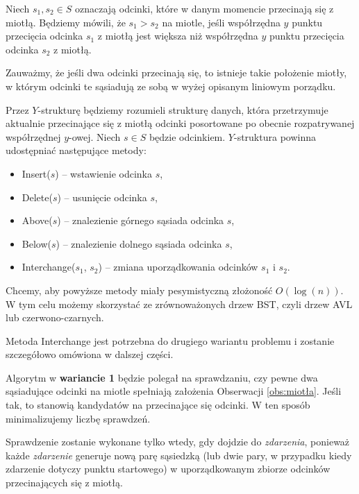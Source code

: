 Niech $s_1, s_2 \in S$ oznaczają odcinki, które w danym momencie przecinają się 
z miotłą. Będziemy mówili, że $s_1 > s_2$ na miotle,
jeśli współrzędna $y$ punktu przecięcia odcinka $s_1$ z miotłą jest większa 
niż współrzędna $y$ punktu przecięcia odcinka $s_2$ z miotłą.

\begin{obs}
	\label{obs:miotła}
	Zauważmy, że jeśli dwa odcinki przecinają się, to istnieje takie położenie
	miotły, w którym odcinki te sąsiadują ze sobą w wyżej opisanym liniowym porządku.
\end{obs} 

Przez $Y$-strukturę będziemy rozumieli strukturę danych, która przetrzymuje aktualnie przecinające się 
z miotłą odcinki posortowane po obecnie rozpatrywanej współrzędnej $y$-owej. Niech $s \in S$ będzie odcinkiem. $Y$-struktura 
powinna udostępniać następujące metody:
\begin{itemize}
	\item Insert($s$) -- wstawienie odcinka $s$,
	\item Delete($s$) -- usunięcie odcinka $s$,
	\item Above($s$) -- znalezienie górnego sąsiada odcinka $s$,
	\item Below($s$) -- znalezienie dolnego sąsiada odcinka $s$,
	\item Interchange($s_1$, $s_2$) -- zmiana uporządkowania odcinków $s_1$ i $s_2$.
\end{itemize}
Chcemy, aby powyższe metody miały pesymistyczną złożoność $O(\log(n))$. W tym celu możemy skorzystać ze zrównoważonych drzew BST, czyli
drzew AVL lub czerwono-czarnych.

Metoda Interchange jest potrzebna do drugiego wariantu 
problemu i zostanie szczegółowo omówiona w dalszej części.

Algorytm w \textbf{wariancie 1} będzie polegał na sprawdzaniu, 
czy pewne dwa sąsiadujące odcinki na miotle spełniają założenia 
Obserwacji \ref{obs:miotła}. Jeśli tak, to stanowią kandydatów na przecinające 
się odcinki. W ten sposób minimalizujemy liczbę sprawdzeń.

Sprawdzenie zostanie wykonane tylko wtedy, gdy dojdzie do \textit{zdarzenia},
ponieważ każde \textit{zdarzenie} generuje nową parę sąsiedzką 
(lub dwie pary, w przypadku kiedy zdarzenie dotyczy punktu startowego) 
w uporządkowanym zbiorze odcinków przecinających się z miotłą.

